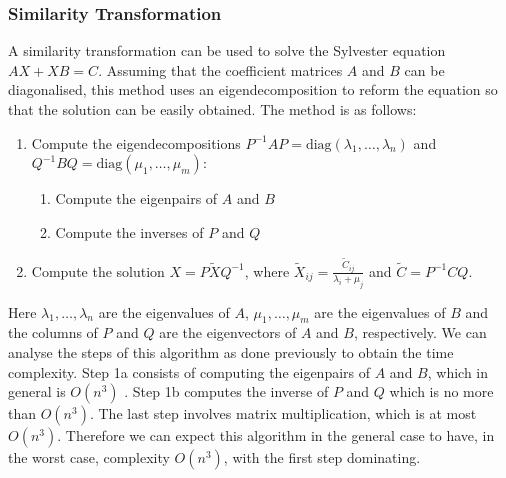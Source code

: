 \documentclass[11pt]{article}
\numberwithin{equation}{section}
\begin{document}
\subsubsection{Similarity Transformation}
A similarity transformation \cite{Simoncini} can be used to solve the Sylvester equation $AX + XB = C$. Assuming that the coefficient matrices $A$ and $B$ can be diagonalised, this method uses an eigendecomposition to reform the equation so that the solution can be easily obtained. The method is as follows:
\begin{enumerate}
\item Compute the eigendecompositions $P^{-1}AP = \text{diag}(\lambda_1, \dots, \lambda_n)$ and $Q^{-1}BQ = \text{diag}(\mu_1, \dots, \mu_m)$:
	\begin{enumerate}
	\item Compute the eigenpairs of $A$ and $B$
	\item Compute the inverses of $P$ and $Q$
	\end{enumerate}
\item Compute the solution $X = P \widetilde{X} Q^{-1}$, where $\widetilde{X}_{ij} = \frac{\widetilde{C}_{ij}}{\lambda_i + \mu_j}$ and $\widetilde{C} = P^{-1}CQ$.
\end{enumerate}
Here $\lambda_1, \dots, \lambda_n$ are the eigenvalues of $A$, $\mu_1, \dots, \mu_m$ are the eigenvalues of $B$ and the columns of $P$ and $Q$ are the eigenvectors of $A$ and $B$, respectively. We can analyse the steps of this algorithm as done previously to obtain the time complexity. Step 1a consists of computing the eigenpairs of $A$ and $B$, which in general is $O(n^3)$ \cite{Pan}. Step 1b computes the inverse of $P$ and $Q$ which is no more than $O(n^3)$. The last step involves matrix multiplication, which is at most $O(n^3)$. Therefore we can expect this algorithm in the general case to have, in the worst case, complexity $O(n^3)$, with the first step dominating.
\end{document}
